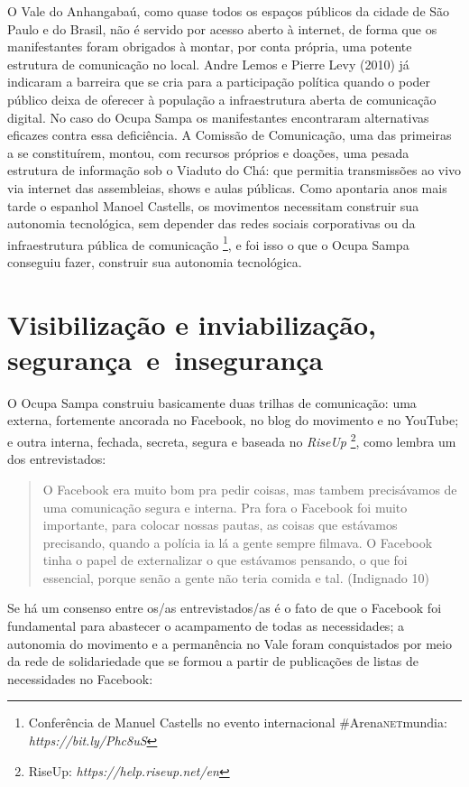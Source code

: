 O Vale do Anhangabaú, como quase todos os espaços públicos da cidade de
São Paulo e do Brasil, não é servido por acesso aberto à internet, de
forma que os manifestantes foram obrigados à montar, por conta própria,
uma potente estrutura de comunicação no local. Andre Lemos e Pierre Levy
(2010) já indicaram a barreira que se cria para a participação política
quando o poder público deixa de oferecer à população a infraestrutura
aberta de comunicação digital. No caso do Ocupa Sampa os manifestantes
encontraram alternativas eficazes contra essa deficiência. A Comissão de
Comunicação, uma das primeiras a se constituírem, montou, com recursos
próprios e doações, uma pesada estrutura de informação sob o Viaduto do
Chá: que permitia transmissões ao vivo via internet das assembleias,
shows e aulas públicas. Como apontaria anos mais tarde o espanhol Manoel
Castells, os movimentos necessitam construir sua autonomia tecnológica,
sem depender das redes sociais corporativas ou da infraestrutura pública
de comunicação \footnote{Conferência de Manuel Castells no evento
  internacional \#Arena\textsc{net}mundia:
  \emph{https://bit.ly/Phc8uS}},
e foi isso o que o Ocupa Sampa conseguiu fazer, construir sua autonomia
tecnológica.

\section{Visibilização e inviabilização, segurança~e~insegurança}

O Ocupa Sampa construiu basicamente duas trilhas de comunicação: uma
externa, fortemente ancorada no Facebook, no blog do movimento e no
YouTube; e outra interna, fechada, secreta, segura e baseada no
\emph{RiseUp} \footnote{RiseUp: \emph{https://help.riseup.net/en}}, como
lembra um dos entrevistados:

\begin{quote}
O Facebook era muito bom pra pedir coisas, mas tambem precisávamos de
uma comunicação segura e interna. Pra fora o Facebook foi muito
importante, para colocar nossas pautas, as coisas que estávamos
precisando, quando a polícia ia lá a gente sempre filmava. O Facebook
tinha o papel de externalizar o que estávamos pensando, o que foi
essencial, porque senão a gente não teria comida e tal. (Indignado 10)
\end{quote}

Se há um consenso entre os/as entrevistados/as é o fato de que o
Facebook foi fundamental para abastecer o acampamento de todas as
necessidades; a autonomia do movimento e a permanência no Vale foram
conquistados por meio da rede de solidariedade que se formou a partir de
publicações de listas de necessidades no Facebook:

